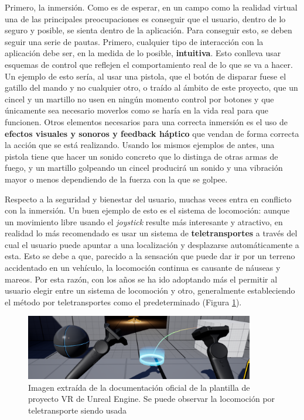 Primero, la inmersión. Como es de esperar, en un campo como la realidad virtual una de las principales preocupaciones es conseguir que el usuario, dentro de lo seguro y posible, se sienta dentro de la aplicación. Para conseguir esto, se deben seguir una serie de pautas. Primero, cualquier tipo de interacción con la aplicación debe ser, en la medida de lo posible, \textbf{intuitiva}. Esto conlleva usar esquemas de control que reflejen el comportamiento real de lo que se va a hacer. Un ejemplo de esto sería, al usar una pistola, que el botón de disparar fuese el gatillo del mando y no cualquier otro, o traído al ámbito de este proyecto, que un cincel y un martillo no usen en ningún momento control por botones y que únicamente sea necesario moverlos como se haría en la vida real para que funcionen. Otros elementos necesarios para una correcta inmersión es el uso de \textbf{efectos visuales y sonoros y feedback háptico} que vendan de forma correcta la acción que se está realizando. Usando los mismos ejemplos de antes, una pistola tiene que hacer un sonido concreto que lo distinga de otras armas de fuego, y un martillo golpeando un cincel producirá un sonido y una vibración mayor o menos dependiendo de la fuerza con la que se golpee.

Respecto a la seguridad y bienestar del usuario, muchas veces entra en conflicto con la inmersión. Un buen ejemplo de esto es el sistema de locomoción: aunque un movimiento libre usando el \textit{joystick} resulte más interesante y atractivo, en realidad lo más recomendado es usar un sistema de \textbf{teletransportes} a través del cual el usuario puede apuntar a una localización y desplazarse automáticamente a esta. Esto se debe a que, parecido a la sensación que puede dar ir por un terreno accidentado en un vehículo, la locomoción continua es causante de náuseas y mareos. Por esta razón, con los años se ha ido adoptando más el permitir al usuario elegir entre un sistema de locomoción y otro, generalmente estableciendo el método por teletransportes como el predeterminado (Figura \ref{fig:plantillaunreal}).

\begin{figure}[H]
	\centering
	\includegraphics[width=10cm]{imagenes/plantillaunreal}
	\caption{Imagen extraída de la documentación oficial de la plantilla de proyecto VR de Unreal Engine. Se puede observar la locomoción por teletransporte siendo usada}
	\label{fig:plantillaunreal}
\end{figure}


